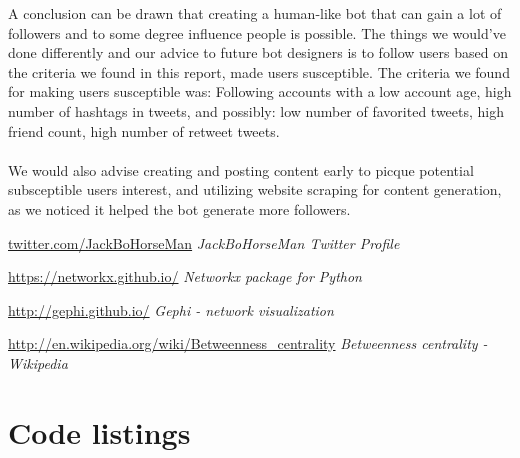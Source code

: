 \documentclass[10pt]{IEEEtran}
\begin{document}
A conclusion can be drawn that creating a human-like bot that can gain a lot of followers and to some degree influence people is possible. The things we would've done differently and our advice to future bot designers is to follow users based on the criteria we found in this report, made users susceptible. The criteria we found for making users susceptible was: Following accounts with a low account age, high number of hashtags in tweets, and possibly: low number of favorited tweets, high friend count, high number of retweet tweets.\\\\

We would also advise creating and posting content early to picque potential subsceptible users interest, and utilizing website scraping for content generation, as we noticed it helped the bot generate more followers.



\begin{thebibliography}{9}

\url{twitter.com/JackBoHorseMan}
\textit{JackBoHorseMan Twitter Profile}

\url{https://networkx.github.io/}
\textit{Networkx package for Python}

\url{http://gephi.github.io/}
\textit{Gephi - network visualization}

\url{http://en.wikipedia.org/wiki/Betweenness_centrality}
\textit{Betweenness centrality - Wikipedia}
\end{thebibliography}

\clearpage
\onecolumn
\appendices
\section{Code listings}

\lstlistoflistings
\label{listing:youtube}
\end{document}
